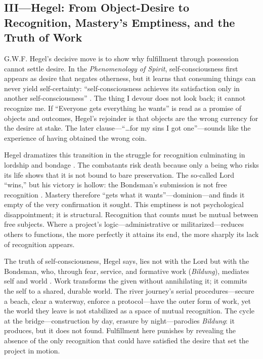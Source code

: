 \subsection*{III—Hegel: From Object-Desire to Recognition, Mastery's Emptiness, and the Truth of
	Work}
\label{ssec:iii-hegel}
G.W.F. Hegel's decisive move is to show why fulfillment through possession cannot settle
desire. In the \emph{Phenomenology of Spirit}, self-consciousness first appears as desire that
negates
otherness, but it learns that consuming things can never yield self-certainty:
``self-consciousness achieves its satisfaction only in another self-consciousness''
\parencite[\S 175]{HegelPhenomenology1977}. The thing I devour does not look back; it cannot
recognize me. If ``Everyone gets everything he wants'' is read as a promise of objects and
outcomes, Hegel's rejoinder is that objects are the wrong currency for the desire at stake.
The later clause—``\ldots for my sins I got one''—sounds like the experience of having obtained
the wrong coin.

Hegel dramatizes this transition in the struggle for recognition culminating in lordship and
bondage \parencite[\S\S 178--196]{HegelPhenomenology1977}. The combatants risk death because
only a being who risks its life shows that it is not bound to bare preservation. The so-called
Lord ``wins,'' but his victory is hollow: the Bondsman's submission is not free recognition
\parencite[\S\S 187--189]{HegelPhenomenology1977}. Mastery therefore ``gets what it
wants''—dominion—and
finds it empty of the very confirmation it sought. This emptiness is not psychological
disappointment; it is structural. Recognition that counts must be mutual between free subjects.
Where a project's logic—administrative or militarized—reduces others to functions, the more
perfectly it attains its end, the more sharply its lack of recognition appears.

The truth of self-consciousness, Hegel says, lies not with the Lord but with the Bondsman, who,
through fear, service, and formative work (\emph{Bildung}), mediates self and world
\parencite[\S 196]{HegelPhenomenology1977}. Work transforms the given without annihilating it;
it commits the self to a shared, durable world. The river journey's serial procedures—secure a
beach, clear a waterway, enforce a protocol—have the outer form of work, yet the world they
leave is not stabilized as a space of mutual recognition. The cycle at the bridge—construction
by day, erasure by night—parodies \emph{Bildung}: it produces, but it does not found.
Fulfillment here punishes by revealing the absence of the only recognition that could have
satisfied the desire that set the project in motion.

